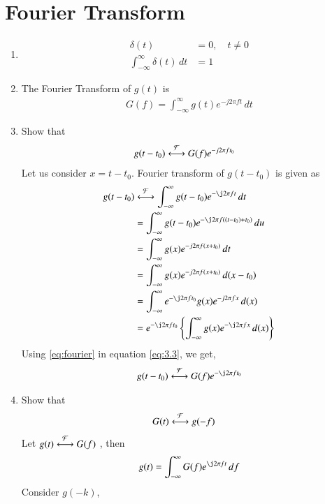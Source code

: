 \documentclass[journal,12pt,twocolumn]{IEEEtran}
\renewcommand\thesection{\arabic{section}}
\begin{document}
\section{Fourier Transform}
\begin{enumerate}[label=\thesection.\arabic*
	,ref=\thesection.\theenumi]
	\item 
	\begin{align}
		\delta(t)&=0, \quad t\neq 0 \\
		\int_{-\infty}^{\infty}\delta(t) \, dt&= 1
	\end{align}
	\item The Fourier Transform of $g(t)$ is
	\begin{align}
		G(f)=\int_{-\infty}^{\infty}g(t)e^{-j2\pi ft}\,dt
		\label{eq:fourier}
	\end{align}
	\item Show that 
	\begin{align}
		g(t-t_0)&\overset{\mathcal{F}}{ \longleftrightarrow}G(f)e^{-j2\pi ft_0}
		\label{eq:t-shift}
	\end{align}
	\solution Let us consider $x=t-t_0$. Fourier transform of $g(t-t_0)$ is given as
	\begin{align}
		g(t-t_0)&\system{F}\int_{-\infty}^{\infty}
		g(t-t_0)e^{-\j2\pi ft}\,dt \\
		&=\int_{-\infty}^{\infty}
		g(t-t_0)e^{-\j2\pi f((t-t_0) + t_0)}\,du \\
		&=\int_{-\infty}^{\infty}
		g(x)e^{-j2\pi f(x+t_0)}\,dt\\
		&=\int_{-\infty}^{\infty}
		g(x)e^{-j2\pi f(x+t_0)}\,d(x-t_0)\\
		&=\int_{-\infty}^{\infty}
		e^{-\j2\pi f t_0}g(x)e^{-j2\pi fx}\,d(x)\\
		\label{eq:3.3}
		&=e^{-\j2\pi f t_0} \cbrak{\int_{-\infty}^{\infty}
		g(x)e^{-\j2\pi fx}\,d(x)}
	\end{align}
Using \eqref{eq:fourier} in equation \eqref{eq:3.3}, we get,
\begin{align}
	\label{eq:3.3.1}
	g(t-t_0)\system{F}G(f)e^{-\j2\pi ft_0}
	\end{align}
	\item Show that
	\begin{align}
		\label{eq:inverse}
		G(t)&\overset{\mathcal{F}}{ \longleftrightarrow}g(-f)
	\end{align}
	\solution 
	Let $g(t)\overset{\mathcal{F}}{ \longleftrightarrow}G(f)$ , then 
	\begin{align}
		\label{eq:inverseFourier}
		g(t)=\int_{-\infty}^{\infty}G(f)e^{\j2\pi ft}\,df
	\end{align}
Consider $g(-k)$,
\begin{align}

\end{align}
\end{enumerate}
\end{document}
